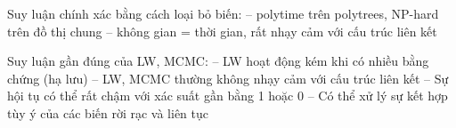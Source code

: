 \documentclass{article}
\begin{document}
\begin{huge}

Suy luận chính xác bằng cách loại bỏ biến: \al
 -- polytime trên polytrees, NP-hard trên đồ thị chung\al
 -- không gian = thời gian, rất nhạy cảm với cấu trúc liên kết

Suy luận gần đúng của LW, MCMC:\al
 -- LW hoạt động kém khi có nhiều bằng chứng (hạ lưu)\al
 -- LW, MCMC thường không nhạy cảm với cấu trúc liên kết\al
 -- Sự hội tụ có thể rất chậm với xác suất gần bằng 1 hoặc 0\al
 -- Có thể xử lý sự kết hợp tùy ý của các biến rời rạc và liên tục



\end{huge} 
\end{document}
